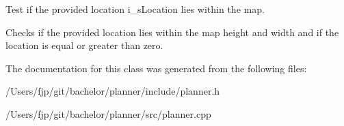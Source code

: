 Test if the provided location i\+\_\+s\+Location lies within the map. 

Checks if the provided location lies within the map height and width and if the location is equal or greater than zero. 

The documentation for this class was generated from the following files\+:\begin{DoxyCompactItemize}
\item 
/\+Users/fjp/git/bachelor/planner/include/planner.\+h\item 
/\+Users/fjp/git/bachelor/planner/src/planner.\+cpp\end{DoxyCompactItemize}
